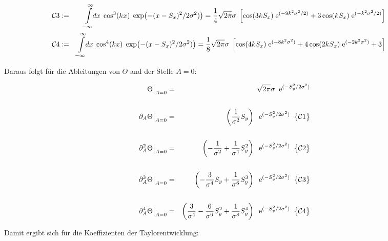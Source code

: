 \begin{small}
    \begin{eqnarray*}
        {\cal C}3 &:=&\int\limits_{-\infty}^{\infty}\!\!dx\;\cos^3(kx)\;\exp\!\left(-(x-S_x)^2/2\sigma^2)\right)
        =\frac{1}{4}\sqrt{2\pi}\sigma\;\left[\cos(3kS_x)\;{\rm e}^{(-9k^2\sigma^2/2)}+3\cos(kS_x)\;{\rm e}^{(-k^2\sigma^2/2)}\right]\phantom{\int\limits_{-\infty}^{\infty}}\\
        {\cal C}4 &:=&\int\limits_{-\infty}^{\infty}\!\!dx\;\cos^4(kx)\;\exp\!\left(-(x-S_x)^2/2\sigma^2)\right)
        =\frac{1}{8}\sqrt{2\pi}\sigma\;\left[\cos(4kS_x)\;{\rm e}^{(-8k^2\sigma^2)}+4\cos(2kS_x)\;{\rm e}^{(-2k^2\sigma^2)}+3\right]\phantom{\int\limits_{-\infty}^{\infty}}
    \end{eqnarray*}
\end{small}

\noindent Daraus folgt für die Ableitungen von $\Theta$ and der Stelle $A=0$:

\begin{small}
    \begin{eqnarray*}
        \Theta\big\vert_{A=0} &=& \sqrt{2\pi}\sigma\;\;{\rm e}^{(-S_y^2/2\sigma^2)}\\
        &&\\
        {\partial_A}
        \Theta\big\vert_{A=0}&=&\left(\frac{1}{\sigma^2}S_y\right)\;\;{\rm e}^{(-S_y^2/2\sigma^2)}\;\;{\big\{}{\cal C}1{\big\}}\\
        &&\\
        {\partial^2_A}
        \Theta\big\vert_{A=0}&=&\left(-\frac{1}{\sigma^2}+\frac{1}{\sigma^4}S_y^2\right)\;\;{\rm e}^{(-S_y^2/2\sigma^2)}\;\;{\big\{}{\cal C}2{\big\}}\\
        &&\\
        {\partial^3_A}
        \Theta\big\vert_{A=0}&=&\left(-\frac{3}{\sigma^4}S_y+\frac{1}{\sigma^6}S_y^3\right)\;\;{\rm e}^{(-S_y^2/2\sigma^2)}\;\;{\big\{}{\cal C}3{\big\}}\\
        &&\\
        {\partial^4_A}
        \Theta\big\vert_{A=0}&=&\left(\frac{3}{\sigma^4}-\frac{6}{\sigma^6}S_y^2+\frac{1}{\sigma^8}S_y^4\right)\;\;{\rm e}^{(-S_y^2/2\sigma^2)}\;\;{\big\{}{\cal C}4{\big\}}\\
    \end{eqnarray*}
\end{small}

\noindent Damit ergibt sich für die Koeffizienten der Taylorentwicklung:

